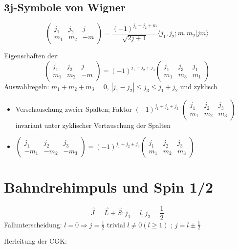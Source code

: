 \subsection{3j-Symbole von Wigner}

\[ \begin{pmatrix} 
j_1 & j_2 & j \\ 
m_1 & m_2 & -m 
\end{pmatrix} = 
\frac{(-1)^{j_1-j_2+m}}{\sqrt{2j+1}}\langle  j_1,j_2;m_1m_2|jm \rangle
\]

Eigenschaften der:
\[ \begin{pmatrix} 
j_1 & j_2 & j \\ 
m_1 & m_2 & -m 
\end{pmatrix} = (-1)^{j_1+j_2+j_3}
\begin{pmatrix} 
j_1 & j_3 & j_1 \\ 
m_1 & m_3 & m_1 
\end{pmatrix}
\] 
Auswahlregeln: \(m_1+m_2+m_3=0\), \(|j_1-j_2|\leq j_3\leq j_1+j_2\) und
zyklisch

\begin{itemize}
\item Verschauschung zweier Spalten; Faktor \((-1)^{j_1+j_2+j_3}\)
\(
\begin{pmatrix} 
j_1 & j_2 & j_3 \\ 
m_1 & m_2 & m_3 
\end{pmatrix}
\) invariant unter zyklischer Vertauschung der Spalten

\item \(
\begin{pmatrix} 
j_1 & j_2 & j_3 \\ 
-m_1 & -m_2 & -m_3 
\end{pmatrix} = (-1)^{j_1+j_2+j_3}
\begin{pmatrix} 
j_1 & j_2 & j_3 \\ 
m_1 & m_2 & m_3 
\end{pmatrix}
\)


\end{itemize}

\section{Bahndrehimpuls und Spin 1/2}

\[\vec J = \vec L + \vec S : j_1=l, j_2 = \frac 1 2\]
Fallunterscheidung: \(l=0\Rightarrow j=\frac 1 2\) trivial
\(l\ne 0 (l\geq 1)\) ; \(j=l\pm\frac 1 2\)

Herleitung der CGK:

